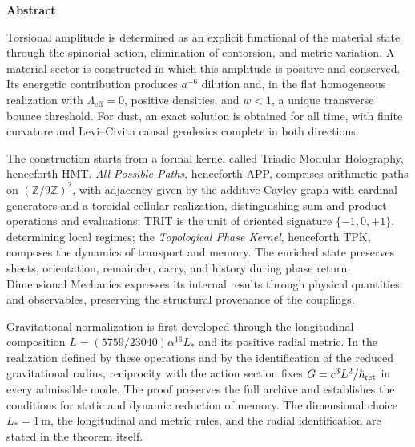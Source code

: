 
\begin{center}\bfseries Abstract\end{center}
\begingroup
\fontsize{10.5}{12}\selectfont
\setlength{\parskip}{2pt plus 1pt minus .5pt}
\noindent
Torsional amplitude is determined as an explicit functional of the
material state through the spinorial action, elimination of contorsion,
and metric variation. A material sector is constructed in which this
amplitude is positive and conserved. Its energetic contribution produces
\(a^{-6}\) dilution and, in the flat homogeneous realization with
\(\Lambda_{\mathrm{eff}}=0\), positive densities, and \(w<1\), a unique
transverse bounce threshold. For dust, an exact solution is obtained for
all time, with finite curvature and Levi--Civita causal geodesics complete
in both directions.

The construction starts from a formal kernel called Triadic Modular
Holography, henceforth HMT. \emph{All Possible Paths}, henceforth APP,
comprises arithmetic paths on \((\mathbb Z/9\mathbb Z)^2\), with
adjacency given by the additive Cayley graph with cardinal generators
and a toroidal cellular realization, distinguishing sum and product
operations and evaluations; TRIT is the unit
of oriented signature \(\{-1,0,+1\}\), determining local regimes; the
\emph{Topological Phase Kernel}, henceforth TPK, composes the dynamics of
transport and memory. The enriched state preserves sheets, orientation,
remainder, carry, and history during phase return. Dimensional Mechanics
expresses its internal results through physical quantities and
observables, preserving the structural provenance of the couplings.

Gravitational normalization is first developed through the longitudinal
composition \(L=(5759/23040)\alpha^{16}L_*\) and its positive radial
metric. In the realization defined by these operations and by the
identification of the reduced gravitational radius, reciprocity with the
action section fixes \(G=c^3L^2/\hbar_{\rm ret}\) in every admissible
mode. The proof preserves the full archive and establishes the conditions
for static and dynamic reduction of memory. The dimensional choice
\(L_*=1\,\mathrm m\), the longitudinal and metric rules, and the
radial identification are stated in the theorem itself.

